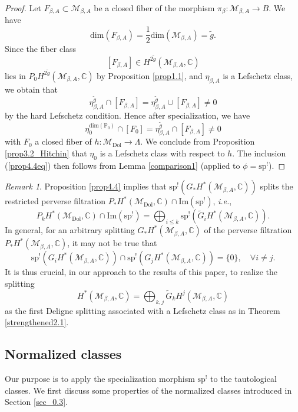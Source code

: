 \documentclass[11pt]{amsart}
\theoremstyle{plain}
\theoremstyle{definition}
\theoremstyle{remark}
\newtheorem{rmk}[thm]{Remark}
\newcommand{\BC}{{\mathbb{C}}}
\newcommand{\CM}{{\mathcal M}}
\begin{document}
\begin{proof}
Let $F_{\beta,A} \subset \CM_{\beta,A}$ be a 
closed fiber of the morphism $\pi_\beta: \CM_{\beta,A} \to B$. We have
\[
 \mathrm{dim}(F_{\beta,A})= \frac{1}{2}\mathrm{dim}(\CM_{\beta,A}) = \tilde{g}.
\]
Since the fiber class 
\[
[F_{\beta,A}] \in H^{2\tilde{g}}(\CM_{\beta,A}, \BC)
\]
lies in $P_0H^{2\tilde{g}}(\CM_{\beta,A}, \BC)$ by Proposition \ref{prop1.1}, and $\eta_{\beta,A}$ is a Lefschetz class, we obtain that
\[
\eta_{\beta,A}^{\tilde{g}}\cap{[F_{\beta,A}]} = \eta_{\beta,A}^{\tilde{g}} \cup [F_{\beta,A}] \neq 0
\]
by the hard Lefschetz condition. Hence after specialization, we have
\[
{\eta_0^{\mathrm{dim(F_0)}}} \cap [F_0]  = \eta_{\beta,A}^{\tilde{g}}\cap{[F_{\beta,A}]} \neq 0
\]
with $F_0$ a closed fiber of $h: \CM_{\mathrm{Dol}} \to \Lambda$. We conclude from Proposition \ref{prop3.2_Hitchin} that $\eta_0$ is a Lefschetz class with respect to $h$. The inclusion  (\ref{prop4.4eq}) then follows from Lemma \ref{comparison1} {(applied to $\phi = \mathrm{sp}^!$)}.
\end{proof}


\begin{rmk}\label{remark1}
Proposition \ref{prop4.4} implies that $\mathrm{sp}^!(G_*H^*(\CM_{\beta,A}, \BC))$ splits the restricted perverse filtration $P_*H^*(\CM_{\mathrm{Dol}}, \BC) \cap \mathrm{Im(sp^!)}$, \emph{i.e.},
\[
P_kH^*(\CM_{\mathrm{Dol}}, \BC) \cap \mathrm{Im(sp^!)} = \bigoplus_{i\leq k} \mathrm{sp}^!\left( \widetilde{G}_iH^*(\CM_{\beta,A}, \BC)\right).
\]
In general, for an arbitrary splitting $G_*H^*(\CM_{\beta,A}, \BC)$ of the perverse filtration $P_*H^*(\CM_{\beta,A}, \BC)$, it may not be true that
\[
\mathrm{sp}^!\left({G}_iH^*(\CM_{\beta,A}, \BC) \right) \cap \mathrm{sp}^!\left({G}_jH^*(\CM_{\beta,A}, \BC) \right) = \{0\}, \quad \forall i\neq j.
\]
It is thus crucial, in our approach to the results of this paper, to realize the splitting 
\[
H^*(\CM_{\beta,A}, \BC) = \bigoplus_{k,j}\widetilde{G}_kH^j(\CM_{\beta,A}, \BC)
\]
as the first  Deligne splitting associated with a Lefschetz class as in Theorem \ref{strengthened2.1}.
\end{rmk}



\subsection{Normalized classes} Our purpose is to apply the specialization morphism $\mathrm{sp}^!$ to the tautological classes. We first discuss some properties of the normalized classes introduced in Section \ref{sec_0.3}.
\end{document}
